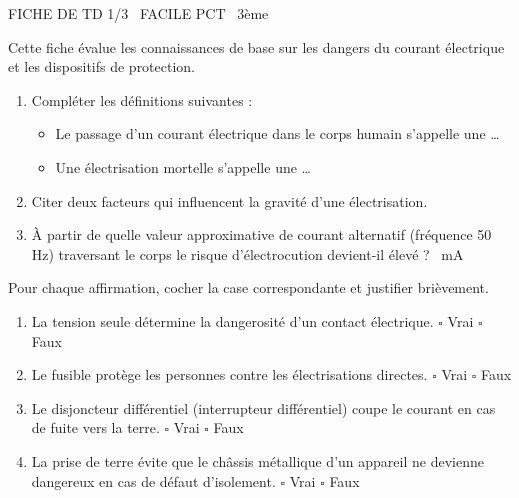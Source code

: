 \documentclass[11pt]{article}
\begin{document}
\begin{tcolorbox}[enhanced,colback=popink,colframe=popink,arc=10pt,boxrule=0pt,left=12pt,right=12pt,top=9pt,bottom=9pt]
{\color{white}\popxbold\small FICHE DE TD 1/3 \textbullet\ FACILE \hfill PCT \textbullet\ 3ème\par}
\end{tcolorbox}
\vspace{4pt}
Cette fiche évalue les connaissances de base sur les dangers du courant électrique et les dispositifs de protection.

\begin{exercice}
\begin{enumerate}
    \item Compléter les définitions suivantes :
    \begin{itemize}
        \item Le passage d'un courant électrique dans le corps humain s'appelle une \ldots
        \item Une électrisation mortelle s'appelle une \ldots
    \end{itemize}
    \item Citer deux facteurs qui influencent la gravité d'une électrisation.
    \item À partir de quelle valeur approximative de courant alternatif (fréquence 50 Hz) traversant le corps le risque d'électrocution devient-il élevé ? \SI{}{\milli\ampere}
\end{enumerate}
\end{exercice}

\begin{exercice}
Pour chaque affirmation, cocher la case correspondante et justifier brièvement.
\begin{enumerate}
    \item La tension seule détermine la dangerosité d'un contact électrique. \hfill $\square$ Vrai \quad $\square$ Faux
    \item Le fusible protège les personnes contre les électrisations directes. \hfill $\square$ Vrai \quad $\square$ Faux
    \item Le disjoncteur différentiel (interrupteur différentiel) coupe le courant en cas de fuite vers la terre. \hfill $\square$ Vrai \quad $\square$ Faux
    \item La prise de terre évite que le châssis métallique d'un appareil ne devienne dangereux en cas de défaut d'isolement. \hfill $\square$ Vrai \quad $\square$ Faux
\end{enumerate}
\end{exercice}
\end{document}
